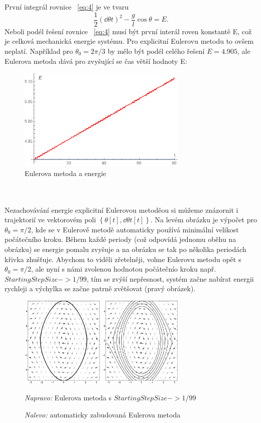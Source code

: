 \documentclass[reqno, a4paper]{amsart}
\begin{document}
\\
\\
První integrál rovnice ~\eqref{eq:4} je ve tvaru
\begin{equation}
	\frac{1}{2}
	\left(
	\dd{\theta}{t}
	\right)^2
	-
	\frac{g}{l}
	\cos \theta
	=
	E
	.
\end{equation}
Neboli podél řešení rovnice ~\eqref{eq:4} musí být první interál roven konstantě E, což je celková mechanická energie systému.
Pro explicitní Eulerovu metodu to ovšem neplatí. Například pro $\theta_{0} =2\pi/3$ by mělo být podél celého řešení $E=4.905$, ale Eulerova metoda dává pro zvyšující se čas větší hodnoty E:
\begin{figure}[h]
	\centering
	\includegraphics[width=0.72\textwidth]{energie}
	\caption*{Eulerova metoda a energie}  
\end{figure}
\\
\\
Nezachovávání energie explicitní Eulerovou metoděou si můžeme znázornit i trajektorií ve vektorovém poli ${\left\lbrace \theta[t],\dd{\theta}{t}[t]\right\rbrace }$. Na levém obrázku je výpočet pro $\theta_{0}=\pi/2$, kde se v Eulerově metodě automaticky používá minimální velikost počátečního kroku. Během každé periody (což odpovídá jednomu oběhu na obrázku) se energie pomalu zvyšuje a na obrázku se tak po několika periodách křivka zhušťuje. Abychom to viděli zřetelněji, volme Eulerovu metodu opět s $\theta_{0}=\pi/2$, ale nyní s námi zvolenou hodnotou počátečnío kroku např. $ StartingStepSize -> 1/99 $, tím se zvýší nepřesnost, systém začne nabírat energii rychleji a výchylka se začne patrně zvětšovat (pravý obrázek).
\begin{figure}[h]
	\centering
	\includegraphics[width=0.72\textwidth]{pole1}
	\caption*{\textit{Nalevo:} automaticky zabudovaná Eulerova metoda}  \textit{Napravo:} Eulerova metoda s $StartingStepSize -> 1/99$  
\end{figure}
\end{document}
